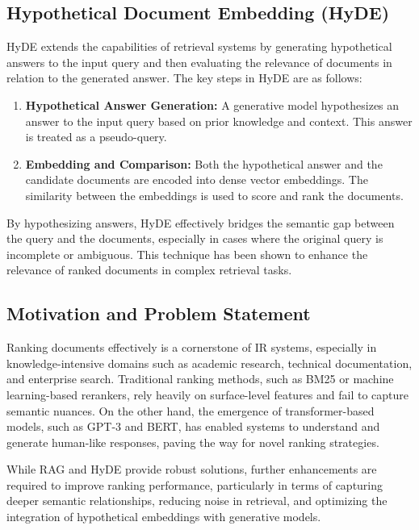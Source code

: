 \subsection{Hypothetical Document Embedding (HyDE)}
HyDE extends the capabilities of retrieval systems by generating hypothetical answers to the input query and then evaluating the relevance of documents in relation to the generated answer. The key steps in HyDE are as follows:
\begin{enumerate}
    \item \textbf{Hypothetical Answer Generation:} A generative model hypothesizes an answer to the input query based on prior knowledge and context. This answer is treated as a pseudo-query.
    \item \textbf{Embedding and Comparison:} Both the hypothetical answer and the candidate documents are encoded into dense vector embeddings. The similarity between the embeddings is used to score and rank the documents.
\end{enumerate}
By hypothesizing answers, HyDE effectively bridges the semantic gap between the query and the documents, especially in cases where the original query is incomplete or ambiguous. This technique has been shown to enhance the relevance of ranked documents in complex retrieval tasks.

\subsection{Motivation and Problem Statement}
Ranking documents effectively is a cornerstone of IR systems, especially in knowledge-intensive domains such as academic research, technical documentation, and enterprise search. Traditional ranking methods, such as BM25 or machine learning-based rerankers, rely heavily on surface-level features and fail to capture semantic nuances. On the other hand, the emergence of transformer-based models, such as GPT-3 and BERT, has enabled systems to understand and generate human-like responses, paving the way for novel ranking strategies.

While RAG and HyDE provide robust solutions, further enhancements are required to improve ranking performance, particularly in terms of capturing deeper semantic relationships, reducing noise in retrieval, and optimizing the integration of hypothetical embeddings with generative models.

